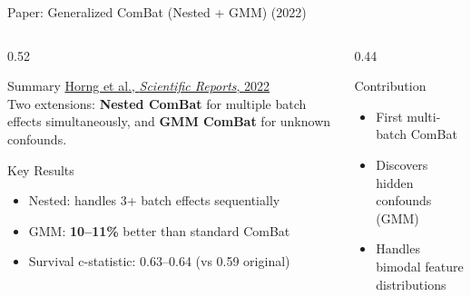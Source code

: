 \documentclass[aspectratio=169,xcolor=dvipsnames]{beamer}
\begin{document}
\begin{frame}{Paper: Generalized ComBat (Nested + GMM) (2022)}
    \begin{columns}
        \begin{column}{0.52\textwidth}
            \begin{block}{Summary}
                \small
                \href{https://doi.org/10.1038/s41598-022-08412-9}{Horng et al., \textit{Scientific Reports}, 2022}\\[0.3em]
                Two extensions: \textbf{Nested ComBat} for multiple batch effects simultaneously, and \textbf{GMM ComBat} for unknown confounds.
            \end{block}

            \vspace{0.2em}

            \begin{block}{Key Results}
                \small
                \begin{itemize}
                    \item Nested: handles 3+ batch effects sequentially
                    \item GMM: \textbf{10--11\%} better than standard ComBat
                    \item Survival c-statistic: 0.63--0.64 (vs 0.59 original)
                \end{itemize}
            \end{block}
        \end{column}

        \begin{column}{0.44\textwidth}
            \begin{block}{Contribution}
                \small
                \begin{itemize}
                    \item First multi-batch ComBat
                    \item Discovers hidden confounds (GMM)
                    \item Handles bimodal feature distributions
                \end{itemize}
            \end{block}

            \vspace{0.2em}


\end{column}
\end{columns}
\end{frame}
\end{document}
